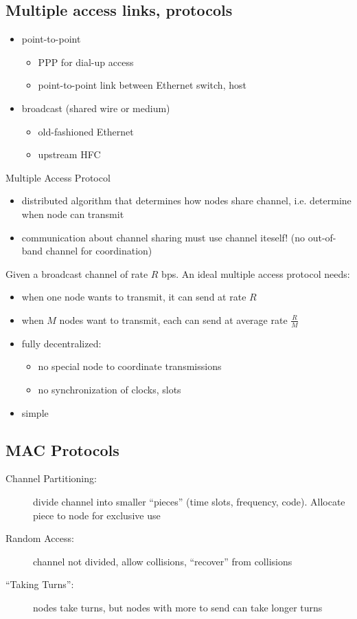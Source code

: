 \subsection{Multiple access links, protocols}
\begin{itemize}
	\item point-to-point
	\begin{itemize}
		\item PPP for dial-up access
		\item point-to-point link between Ethernet switch, host
	\end{itemize}
	\item broadcast (shared wire or medium)
	\begin{itemize}
		\item old-fashioned Ethernet
		\item upstream HFC
	\end{itemize}
\end{itemize}
\begin{note}{Multiple Access Protocol}
	\begin{itemize}
		\item distributed algorithm that determines how nodes share channel, i.e. determine when node can transmit
		\item communication about channel sharing must use channel iteself! (no out-of-band channel for coordination)
	\end{itemize}
\end{note}
Given a broadcast channel of rate $R$ bps. An ideal multiple access protocol needs:
\begin{itemize}
	\item when one node wants to transmit, it can send at rate $R$
	\item when $M$ nodes want to transmit, each can send at average rate $\frac{R}{M}$
	\item fully decentralized:
	\begin{itemize}
		\item no special node to coordinate transmissions
		\item no synchronization of clocks, slots
	\end{itemize}
	\item simple
\end{itemize}

\subsection{MAC Protocols}
\begin{description}
	\item[Channel Partitioning:] divide channel into smaller ``pieces'' (time slots, frequency, code). Allocate piece to node for exclusive use
	\item[Random Access:] channel not divided, allow collisions, ``recover'' from collisions
	\item[``Taking Turns'':] nodes take turns, but nodes with more to send can take longer turns
\end{description}

